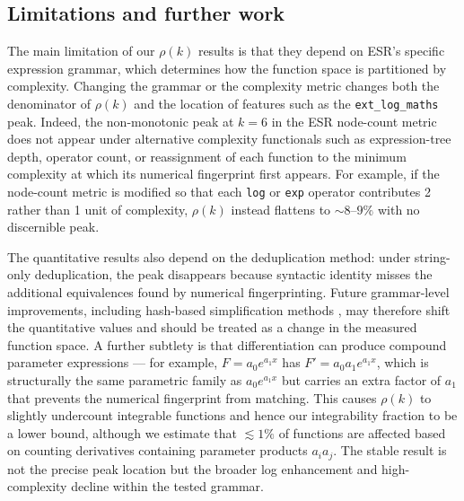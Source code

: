 \documentclass[preprint,12pt,authoryear]{elsarticle}
\newcommand{\rhok}{\rho(k)}
\newcommand{\codexadd}[1]{{\color{purple}#1}}
\newcommand{\hd}[1]{{\color{red}\textbf{[HD: #1]}}}
\begin{document}
\subsection{Limitations and further work}

\codexadd{The main limitation of our $\rho(k)$ results is that they depend on ESR's specific expression grammar, which determines how the function space is partitioned by complexity. Changing the grammar or the complexity metric changes both the denominator of $\rhok$ and the location of features such as the \texttt{ext\_log\_maths} peak. Indeed, the non-monotonic peak at $k=6$ in the ESR node-count metric does not appear under alternative complexity functionals such as expression-tree depth, operator count, or reassignment of each function to the minimum complexity at which its numerical fingerprint first appears. For example, if the node-count metric is modified so that each \texttt{log} or \texttt{exp} operator contributes 2 rather than 1 unit of complexity, $\rhok$ instead flattens to $\sim 8$--$9\%$ with no discernible peak.}

\codexadd{The quantitative results also depend on the deduplication method: under string-only deduplication, the peak disappears because syntactic identity misses the additional equivalences found by numerical fingerprinting. Future grammar-level improvements, including hash-based simplification methods \citep{hash,Kronberger2024}, may therefore shift the quantitative values and should be treated as a change in the measured function space.
A further subtlety is that differentiation can produce compound parameter expressions --- for example, $F = a_0 e^{a_1 x}$ has $F' = a_0 a_1 e^{a_1 x}$, which is structurally the same parametric family as $a_0 e^{a_1 x}$ but carries an extra factor of $a_1$ that prevents the numerical fingerprint from matching. This causes $\rhok$ to slightly undercount integrable functions and hence our integrability fraction to be a lower bound, although we estimate that $\lesssim 1\%$ of functions are affected based on counting derivatives containing parameter products $a_i a_j$.
The stable result is not the precise peak location but the broader log enhancement and high-complexity decline within the tested grammar.}


\end{document}
